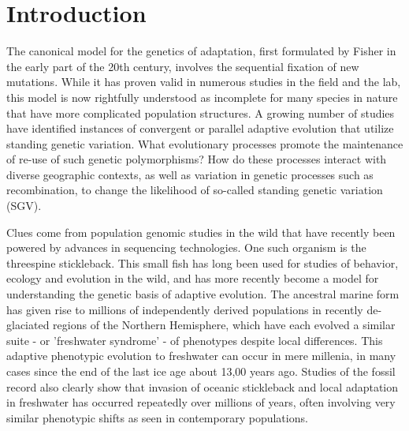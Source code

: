 \documentclass{article}
\begin{document}
\section*{Introduction}

%

The canonical model for the genetics of adaptation, first formulated by Fisher in the early part of the 20th century, involves the sequential fixation of new mutations. While it has proven valid in numerous studies in the field and the lab, this model is now rightfully understood as incomplete for many species in nature that have more complicated population structures. A growing number of studies have identified instances of convergent or parallel adaptive evolution that utilize standing genetic variation. What evolutionary processes promote the maintenance of re-use of such genetic polymorphisms? How do these processes interact with diverse geographic contexts, as well as variation in genetic processes such as recombination, to change the likelihood of so-called standing genetic variation (SGV). 

Clues come from population genomic studies in the wild that have recently been powered by advances in sequencing technologies. One such organism is the threespine stickleback. This small fish has long been used for studies of behavior, ecology and evolution in the wild, and has more recently become a model for understanding the genetic basis of adaptive evolution. The ancestral marine form has given rise to millions of independently derived populations in recently de-glaciated regions of the Northern Hemisphere, which have each evolved a similar suite - or 'freshwater syndrome' - of phenotypes despite local differences. This adaptive phenotypic evolution to freshwater can occur in mere millenia, in many cases since the end of the last ice age about 13,00 years ago. Studies of the fossil record also clearly show that invasion of oceanic stickleback and local adaptation in freshwater has occurred repeatedly over millions of years, often involving very similar phenotypic shifts as seen in contemporary populations.
    
\end{document}
